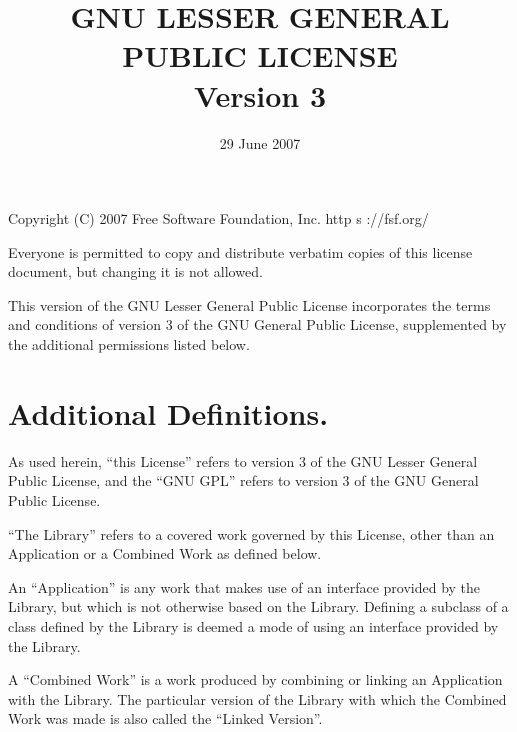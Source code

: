 \documentclass[a4paper, 12pt]{article}
\begin{document}
\title{GNU LESSER GENERAL PUBLIC LICENSE\\ Version 3}
\date{29 June 2007}

\maketitle

Copyright (C) 2007 Free Software Foundation, Inc. \textlangle{}http s ://fsf.org/\textrangle{}

\vspace{0.3cm}

Everyone is permitted to copy and distribute verbatim copies of this license document, but changing it is not allowed.

\vspace{0.3cm}

This version of the GNU Lesser General Public License incorporates the terms and conditions of version 3 of the GNU General Public License, supplemented by the additional permissions listed below.

\section{Additional Definitions.}

As used herein, ``this License'' refers to version 3 of the GNU Lesser General Public License, and the ``GNU GPL'' refers to version 3 of the GNU General Public License.

\vspace{0.3cm}

``The Library'' refers to a covered work governed by this License, other than an Application or a Combined Work as defined below.

\vspace{0.3cm}

An ``Application'' is any work that makes use of an interface provided by the Library, but which is not otherwise based on the Library. Defining a subclass of a class defined by the Library is deemed a mode of using an interface provided by the Library.

\vspace{0.3cm}

A ``Combined Work'' is a work produced by combining or linking an Application with the Library. The particular version of the Library with which the Combined Work was made is also called the ``Linked Version''.

\vspace{0.3cm}
\end{document}
